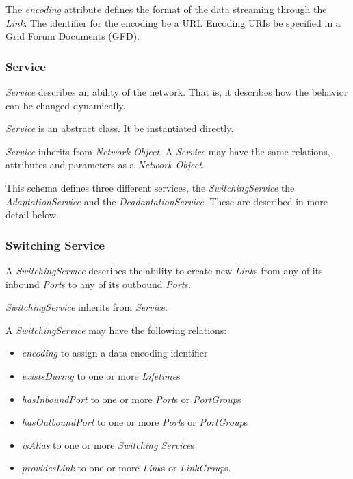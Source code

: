 The \emph{encoding} attribute defines the format of the data streaming through the \emph{Link}. The identifier for the encoding \MUST{} be a URI. Encoding URIs \SHOULD{} be specified in a Grid Forum Documents (GFD).


\subsubsection{Service}%
\label{class:service}

\emph{Service} describes an ability of the network. That is, it describes how the behavior can be changed dynamically.

\emph{Service} is an abstract class. It \MUSTNOT{} be instantiated directly.

\emph{Service} inherits from \emph{Network Object}.
A \emph{Service} may have the same relations, attributes and parameters as a \emph{Network Object}.

This schema defines three different services, the \emph{SwitchingService} the \emph{AdaptationService} and the \emph{DeadaptationService}. These are described in more detail below. 


\subsubsection{Switching Service}%
\label{class:switching_service}

A \emph{SwitchingService} describes the ability to create new \emph{Link}s from any of its inbound \emph{Port}s to any of its outbound \emph{Port}s.

\emph{SwitchingService} inherits from \emph{Service}.

A \emph{SwitchingService} may have the following relations:
\begin{itemize}
    \item \emph{encoding} to assign a data encoding identifier
    \item \emph{existsDuring} to one or more \emph{Lifetime}s
    \item \emph{hasInboundPort} to one or more \emph{Port}s or \emph{PortGroup}s
    \item \emph{hasOutboundPort} to one or more \emph{Port}s or \emph{PortGroup}s
    \item \emph{isAlias} to one or more \emph{Switching Service}s
    \item \emph{providesLink} to one or more \emph{Link}s or \emph{LinkGroup}s.
\end{itemize}

